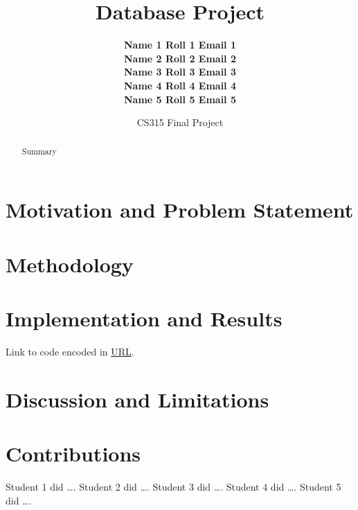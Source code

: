 \documentclass[11pt]{article}
\title{\bf Database Project}
\author{
	\bf Name 1 \qquad Roll 1 \qquad Email 1 \\
	\bf Name 2 \qquad Roll 2 \qquad Email 2 \\
	\bf Name 3 \qquad Roll 3 \qquad Email 3 \\
	\bf Name 4 \qquad Roll 4 \qquad Email 4 \\
	\bf Name 5 \qquad Roll 5 \qquad Email 5
}
\date{CS315 Final Project}
\begin{document}
\maketitle

\begin{abstract}
	Summary
\end{abstract}

\section{Motivation and Problem Statement}

\section{Methodology}

\section{Implementation and Results}

Link to code encoded in \url{URL}.

\section{Discussion and Limitations}

\section{Contributions}

Student 1 did \dots.
Student 2 did \dots.
Student 3 did \dots.
Student 4 did \dots.
Student 5 did \dots.
\end{document}
